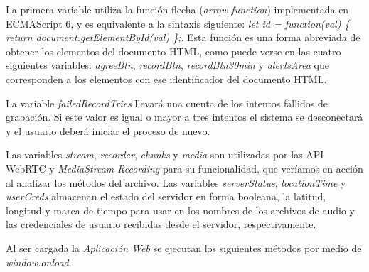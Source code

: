 La primera variable utiliza la función flecha (\emph{arrow function}) implementada en ECMAScript 6, y es equivalente a la sintaxis siguiente: \emph{let id = function(val) \{ return document.getElementById(val) \};}. Esta función es una forma abreviada de obtener los elementos del documento HTML, como puede verse en las cuatro siguientes variables: \emph{agreeBtn}, \emph{recordBtn}, \emph{recordBtn30min} y \emph{alertsArea} que corresponden a los elementos con ese identificador del documento HTML.

La variable \emph{failedRecordTries} llevará una cuenta de los intentos fallidos de grabación. Si este valor es igual o mayor a tres intentos el sistema se desconectará y el usuario deberá iniciar el proceso de nuevo.

Las variables \emph{stream}, \emph{recorder}, \emph{chunks} y \emph{media} son utilizadas por las API WebRTC y \emph{MediaStream Recording} para su funcionalidad, que veríamos en acción al analizar los métodos del archivo. Las variables \emph{serverStatus}, \emph{locationTime} y \emph{userCreds} almacenan el estado del servidor en forma booleana, la latitud, longitud y marca de tiempo para usar en los nombres de los archivos de audio y las credenciales de usuario recibidas desde el servidor, respectivamente.

Al ser cargada la \emph{Aplicación Web} se ejecutan los siguientes métodos por medio de \emph{window.onload}.



